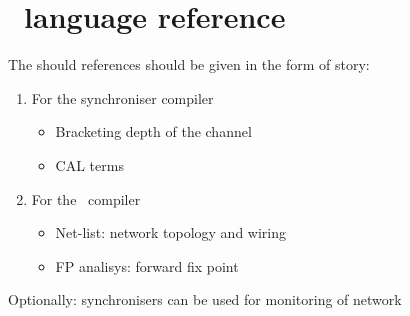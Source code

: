 \chapter{\ak\ language reference}
The should references should be given in the form of story:
\begin{enumerate}
\item For the synchroniser compiler
  \begin{itemize}
  \item Bracketing depth of the channel
  \item CAL terms

  \end{itemize}
  
\item For the \ak\ compiler
  \begin{itemize}
  \item Net-list: network topology and wiring
  \item FP analisys: forward fix point
  \end{itemize}

\end{enumerate}

Optionally: synchronisers can be used for monitoring of network

